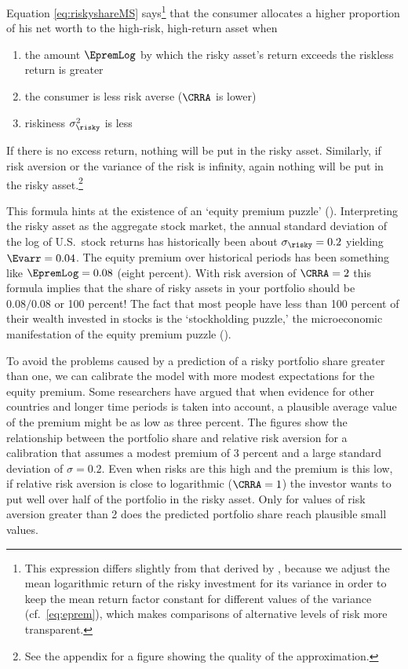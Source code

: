 Equation \eqref{eq:riskyshareMS} says\footnote{This expression differs
  slightly from that derived by \cite{cvAppendix}, because we adjust
  the mean logarithmic return of the risky investment for its variance
  in order to keep the mean return factor constant for different values of the variance (cf.\ \eqref{eq:eprem}), which makes
  comparisons of alternative levels of risk more transparent.}  that the
consumer allocates a higher proportion of his net worth to the high-risk, high-return
asset when
\begin{enumerate}
\item the amount $\EpremLog$ by which the risky
asset's return exceeds the riskless return is greater
\item the consumer is less risk averse ($\CRRA$ is lower)
\item riskiness $\sigma^{2}_{\risky}$ is less
\end{enumerate}
If there is no excess return, nothing will be put in the risky asset.  Similarly, if
risk aversion or the variance of the risk is infinity, again nothing
will be put in the risky asset.\footnote{See the appendix for a figure
  showing the quality of the approximation.}

This formula hints at the existence of an `equity premium puzzle'
(\cite{mehraPrescottPuzzle}).  Interpreting the risky asset as the
aggregate stock market, the annual standard deviation of the log of
U.S.\ stock returns has historically been about $\sigma_{\risky}=0.2$
yielding $\Evarr = 0.04$.  The equity premium over historical periods
has been something like $\EpremLog = 0.08$ (eight percent).  With risk
aversion of $\CRRA=2$ this formula implies that the share of risky
assets in your portfolio should be $0.08/0.08$ or 100 percent!  The
fact that most people have less than 100 percent of their wealth
invested in stocks is the `stockholding puzzle,' the microeconomic
manifestation of the equity premium puzzle
(\cite{haliassos&bertaut:fewholdstocks}).

To avoid the problems caused by a prediction of a risky portfolio
share greater than one, we can calibrate the model with more modest
expectations for the equity premium.  Some researchers have argued
that when evidence for other countries and longer time periods is
taken into account, a plausible average value of the premium might be
as low as three percent.  The figures show the relationship
between the portfolio share and relative risk aversion for a
calibration that assumes a modest premium of 3 percent and a large
standard deviation of $\sigma=0.2$.  Even when risks are this high and
the premium is this low, if relative risk aversion is close to
logarithmic ($\CRRA = 1$) the investor wants to put well over half of
the portfolio in the risky asset.  Only for values of risk aversion
greater than 2 does the predicted portfolio share reach plausible
small values.

